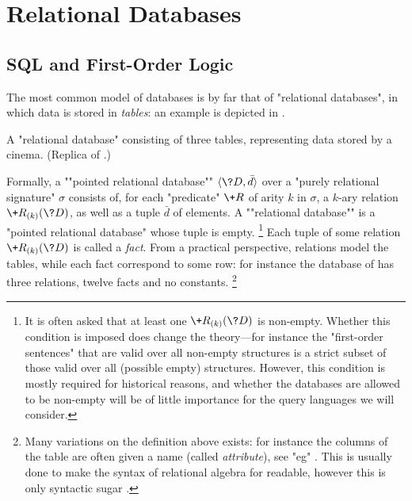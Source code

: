 \section{Relational Databases}

\subsection{SQL and First-Order Logic}

The most common model of databases is by far that of "relational databases",
in which data is stored in \emph{tables}: an example is depicted
in .

\begin{table}
	\centering%
	
	\caption{
		\AP\label{fig:relational-database-cinema}
		A "relational database" consisting of three tables, representing data
		stored by a cinema. (Replica of .)
	}
\end{table}

Formally, a \AP""pointed relational database"" $\tup{\?D, \bar d}$
over a "purely relational signature" $\sigma$
consists of, for each "predicate" $\+R$ of arity $k$ in $\sigma$,
a $k$-ary relation $\+R_{(k)}(\?D)$, as well as a tuple $\bar d$ of elements.%
A \AP""relational database"" is a "pointed relational database" whose tuple is empty.
\footnote{It is often asked that at least one $\+R_{(k)}(\?D)$ is non-empty.
Whether this condition is imposed does change the theory---for instance the "first-order sentences"
that are valid over all non-empty structures is a strict subset of
those valid over all (possible empty) structures.
However, this condition is mostly required for historical reasons,
and whether the databases are allowed to be non-empty
will be of little importance for the query languages we will consider.}
Each tuple of some relation $\+R_{(k)}(\?D)$ is called a \emph{fact}.
From a practical perspective, relations model the tables,
while each fact correspond to some row: for 
instance the database of 
has three relations, twelve facts and no constants.%
\footnote{Many variations on the definition above exists:
for instance the columns of the table are often given a name (called \emph{attribute}),
see "eg" \cite[\S\!\S~3.1--3.2]{AbiteboulHullVianu1995Databases}.
This is usually done to make the syntax of relational algebra for readable,
however this is only syntactic sugar \cite[Proposition~5.1.2]{AbiteboulHullVianu1995Databases}.}

